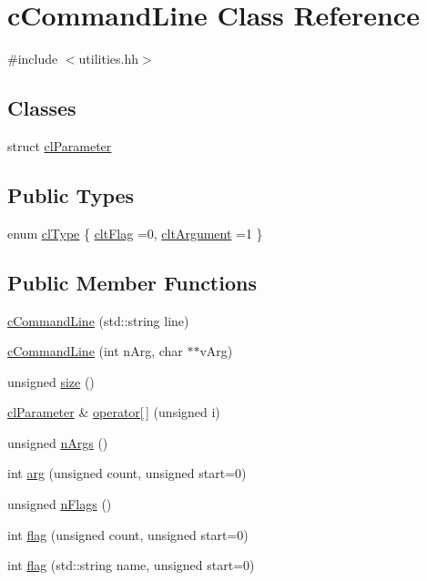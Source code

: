 \hypertarget{classcCommandLine}{}\section{c\+Command\+Line Class Reference}
\label{classcCommandLine}


{\ttfamily \#include $<$utilities.\+hh$>$}

\subsection*{Classes}
\begin{DoxyCompactItemize}
\item 
struct \hyperlink{structcCommandLine_1_1clParameter}{cl\+Parameter}
\end{DoxyCompactItemize}
\subsection*{Public Types}
\begin{DoxyCompactItemize}
\item 
enum \hyperlink{classcCommandLine_a81ec4892969530bbd91486e6cb872054}{cl\+Type} \{ \hyperlink{classcCommandLine_a81ec4892969530bbd91486e6cb872054ae373dbf7e049b7d7fdbe75c4f91696cd}{clt\+Flag} =0, 
\hyperlink{classcCommandLine_a81ec4892969530bbd91486e6cb872054abf74da44500e2e049b5e00063306ee2e}{clt\+Argument} =1
 \}
\end{DoxyCompactItemize}
\subsection*{Public Member Functions}
\begin{DoxyCompactItemize}
\item 
\hyperlink{classcCommandLine_a70d7d8db2e25e26954221680f4f81bbd}{c\+Command\+Line} (std\+::string line)
\item 
\hyperlink{classcCommandLine_adef219a87317597446f866f7a1eaffe3}{c\+Command\+Line} (int n\+Arg, char $\ast$$\ast$v\+Arg)
\item 
unsigned \hyperlink{classcCommandLine_a80abb1b2a58d6d5488cda091914e9df6}{size} ()
\item 
\hyperlink{structcCommandLine_1_1clParameter}{cl\+Parameter} \& \hyperlink{classcCommandLine_acad9f993c21ecb3482c75f90c5135af4}{operator\mbox{[}$\,$\mbox{]}} (unsigned i)
\item 
unsigned \hyperlink{classcCommandLine_a11eca9b05e112b94f4414e89e85923f9}{n\+Args} ()
\item 
int \hyperlink{classcCommandLine_a60f9b1445b6bc0a18bcf360be2b9fa36}{arg} (unsigned count, unsigned start=0)
\item 
unsigned \hyperlink{classcCommandLine_a9ae109a4421ca07494fae4a62fb65961}{n\+Flags} ()
\item 
int \hyperlink{classcCommandLine_aaf01c0441e4aec3cb5d0590051265fce}{flag} (unsigned count, unsigned start=0)
\item 
int \hyperlink{classcCommandLine_aaa0c5f1a6c7e7bf2db5525595c78a38f}{flag} (std\+::string name, unsigned start=0)
\end{DoxyCompactItemize}
